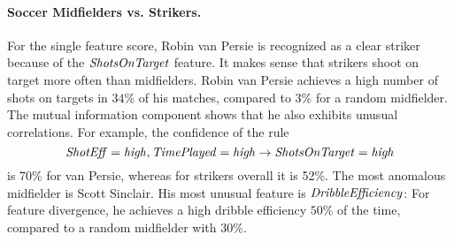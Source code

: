 {							\paragraph{Soccer Midfielders vs. Strikers.} 
							
							For the single feature score, Robin van Persie is recognized as a clear striker because of the $\it{ShotsOnTarget}$ feature. It makes sense that strikers shoot on target more often than midfielders. Robin van Persie  achieves a high number of shots on targets in $34\%$ of his matches, compared to $3\%$ for a random midfielder. The mutual information component shows that he also exhibits  unusual correlations. For example, 
							the confidence of the rule
							$$\it{ShotEff} = \it{high}, \it{TimePlayed} = \it{high} \rightarrow \it{ShotsOnTarget} = \it{high}$$
							is 70\% for van Persie, whereas for strikers overall it is 52\%.
							The most anomalous midfielder is Scott Sinclair. His most unusual feature is $\it{DribbleEfficiency}$: For feature divergence, he achieves a high dribble efficiency $50\%$ of the time, compared to a random midfielder with $30\%$. 
}
